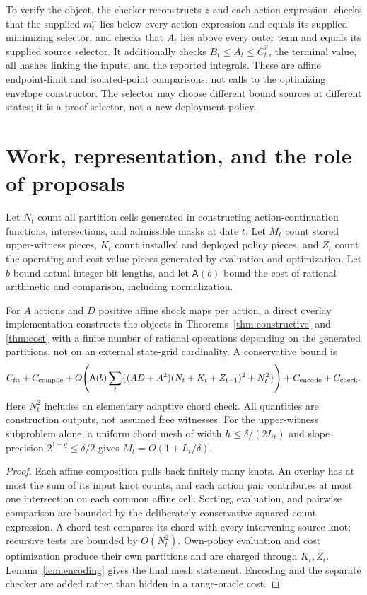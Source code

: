 To verify the object, the checker reconstructs $z$ and each action expression, checks that the supplied $m_t^\mu$ lies below every action expression and equals its supplied minimizing selector, and checks that $A_t$ lies above every outer term and equals its supplied source selector. It additionally checks $B_t\le A_t\le C_t^{\widehat\pi}$, the terminal value, all hashes linking the inputs, and the reported integrals. These are affine endpoint-limit and isolated-point comparisons, not calls to the optimizing envelope constructor. The selector may choose different bound sources at different states; it is a proof selector, not a new deployment policy.


\section{Work, representation, and the role of proposals}\label{sec:work}
Let $N_t$ count all partition cells generated in constructing action-continuation functions, intersections, and admissible masks at date $t$. Let $M_t$ count stored upper-witness pieces, $K_t$ count installed and deployed policy pieces, and $Z_t$ count the operating and cost-value pieces generated by evaluation and optimization. Let $b$ bound actual integer bit lengths, and let $\mathsf A(b)$ bound the cost of rational arithmetic and comparison, including normalization.

\begin{proposition}\label{prop:work}
For $A$ actions and $D$ positive affine shock maps per action, a direct overlay implementation constructs the objects in Theorems~\ref{thm:constructive} and \ref{thm:cost} with a finite number of rational operations depending on the generated partitions, not on an external state-grid cardinality. A conservative bound is
\begin{equation}\label{eq:work}
 C_{\rm fit}+C_{\rm compile}
 +O\!\left(\mathsf A(b)\sum_t
 \{(AD+A^2)(N_t+K_t+Z_{t+1})^2+N_t^2\}\right)
 +C_{\rm encode}+C_{\rm check}.
\end{equation}
Here $N_t^2$ includes an elementary adaptive chord check. All quantities are construction outputs, not assumed free witnesses. For the upper-witness subproblem alone, a uniform chord mesh of width $h\le\delta/(2L_t)$ and slope precision $2^{1-q}\le\delta/2$ gives $M_t=O(1+L_t/\delta)$.
\end{proposition}
\begin{proof}
Each affine composition pulls back finitely many knots. An overlay has at most the sum of its input knot counts, and each action pair contributes at most one intersection on each common affine cell. Sorting, evaluation, and pairwise comparison are bounded by the deliberately conservative squared-count expression. A chord test compares its chord with every intervening source knot; recursive tests are bounded by $O(N_t^2)$. Own-policy evaluation and cost optimization produce their own partitions and are charged through $K_t,Z_t$. Lemma~\ref{lem:encoding} gives the final mesh statement. Encoding and the separate checker are added rather than hidden in a range-oracle cost.\end{proof}

